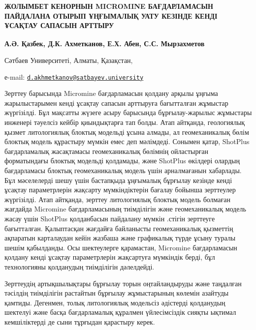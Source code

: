 \begin{articleheader}
{\bfseries ЖОЛЫМБЕТ КЕНОРНЫН MICROMINE БАҒДАРЛАМАСЫН ПАЙДАЛАНА ОТЫРЫП
ҰҢҒЫМАЛЫҚ УАТУ КЕЗІНДЕ КЕНДІ ҰСАҚТАУ САПАСЫН АРТТЫРУ}

{\bfseries А.Ә. Қазбек, Д.К. Ахметканов\textsuperscript{\envelope }, Е.Х. Абен, С.С.
Мырзахметов}
\end{articleheader}
\begin{affiliation}

Сәтбаев Университеті, Алматы, Қазақстан,

е-mail: \href{mailto:d.akhmetkanov@satbayev.university}{\nolinkurl{d.akhmetkanov@satbayev.university}}
\end{affiliation}

Зерттеу барысында Micromine бағдарламасын қолдану арқылы ұңғыма
жарылыстарымен кенді ұсақтау сапасын арттыруға бағытталған жұмыстар
жүргізілді. Бұл мақсатты жүзеге асыру барысында бұрғылау-жарылыс
жұмыстары инженері тәуелсіз кейбір қиындықтарға тап болды. Атап
айтқанда, геологиялық қызмет литологиялық блоктық модельді ұсына алмады,
ал геомеханикалық бөлім блоктық модель құрастыру мүмкін емес деп
мәлімдеді. Сонымен қатар, ShotPlus бағдарламалық жасақтамасы
геомеханикалық бөлімнің ойластырған форматындағы блоктық модельді
қолдамады, және ShotPlus өкілдері олардың бағдарламасы блоктық
геомеханикалық модель үшін арналмағанын хабарлады. Бұл мәселелерді шешу
үшін бастапқыда ұңғымалық бұрғылау кезінде кенді ұсақтау параметрлерін
жақсарту мүмкіндіктерін бағалау бойынша зерттеулер жүргізілді. Атап
айтқанда, зерттеу литологиялық блоктық модель болмаған жағдайда
Micromine бағдарламасының тиімділігін және геомеханикалық модель жасау
үшін ShotPlus қолданбасын пайдалану мүмкін .стігін зерттеуге
бағытталған. Қалыптасқан жағдайға байланысты геомеханикалық қызметтің
ақпаратын карталаудан кейін жазбаша және графикалық түрде ұсыну туралы
шешім қабылданды. Осы шектеулерге қарамастан, Micromine бағдарламасын
қолдану кенді ұсақтау параметрлерін жақсартуға мүмкіндік берді, бұл
технологияны қолданудың тиімділігін дәлелдейді.

Зерттеудің артықшылықтары бұрғылау торын оңтайландыруды және таңдалған
тәсілдің тиімділігін растайтын бұрғылау жұмыстарының көлемін азайтуды
қамтиды. Дегенмен, толық литологиялық модельсіз әдістерді қолданудың
шектелуі және басқа бағдарламалық құралмен үйлесімсіздік сияқты ықтимал
кемшіліктерді де сыни тұрғыдан қарастыру керек.


